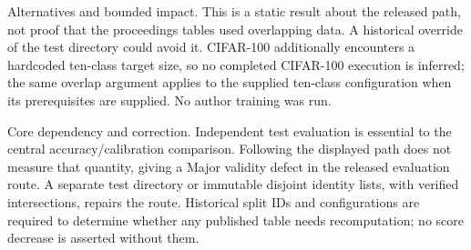 \documentclass[10pt]{article}
\begin{document}
Alternatives and bounded impact. This is a static result about the released path, not proof that the proceedings tables used overlapping data. A historical override of the test directory could avoid it. CIFAR-100 additionally encounters a hardcoded ten-class target size, so no completed CIFAR-100 execution is inferred; the same overlap argument applies to the supplied ten-class configuration when its prerequisites are supplied. No author training was run.\par
Core dependency and correction. Independent test evaluation is essential to the central accuracy/calibration comparison. Following the displayed path does not measure that quantity, giving a Major validity defect in the released evaluation route. A separate test directory or immutable disjoint identity lists, with verified intersections, repairs the route. Historical split IDs and configurations are required to determine whether any published table needs recomputation; no score decrease is asserted without them.\par
\end{document}
